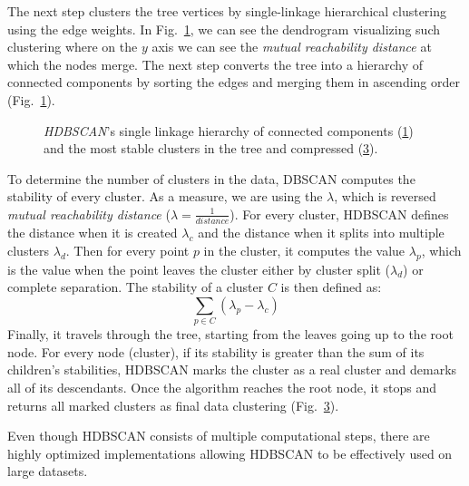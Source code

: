 The next step clusters the tree vertices by single-linkage hierarchical clustering using the edge weights. In Fig.~\ref{fig:hdbscan_hier}, we can see the dendrogram visualizing such clustering where on the $y$ axis we can see the \textit{mutual reachability distance} at which the nodes merge.
The next step converts the tree into a hierarchy of connected components by sorting the edges and merging them in ascending order (Fig.~\ref{fig:hdbscan_hier}). 
\begin{figure}[ht]
     \centering
     \begin{subfigure}[b]{0.48\textwidth}
        \centering
        
        \caption{}
        \label{fig:hdbscan_hier}
     \end{subfigure}
     \hfill
     \begin{subfigure}[b]{0.48\textwidth}
        \centering
        
        \caption{}
        \label{fig:hdbscan_cons}
     \end{subfigure}
    \caption{\textit{HDBSCAN}'s single linkage hierarchy of connected components (\ref{fig:hdbscan_hier}) and the most stable clusters in the tree and compressed (\ref{fig:hdbscan_cons}).
    }
\end{figure}
To determine the number of clusters in the data, DBSCAN computes the stability of every cluster. As a measure, we are using the $\lambda$, which is reversed \textit{mutual reachability distance} ($\lambda = \frac{1}{distance}$). For every cluster, HDBSCAN defines the distance when it is created $\lambda_c$ and the distance when it splits into multiple clusters $\lambda_d$. Then for every point $p$ in the cluster, it computes the value $\lambda_p$, which is the value when the point leaves the cluster either by cluster split ($\lambda_d$) or complete separation. The stability of a cluster $C$ is then defined as:
\begin{equation}
    \sum_{p \in C}(\lambda_p - \lambda_c)
\end{equation}
Finally, it travels through the tree, starting from the leaves going up to the root node. For every node (cluster), if its stability is greater than the sum of its children's stabilities, HDBSCAN marks the cluster as a real cluster and demarks all of its descendants. Once the algorithm reaches the root node, it stops and returns all marked clusters as final data clustering (Fig.~\ref{fig:hdbscan_cons}).

Even though HDBSCAN consists of multiple computational steps, there are highly optimized implementations \cite{vis:hdbscan-imp} allowing HDBSCAN to be effectively used on large datasets.

